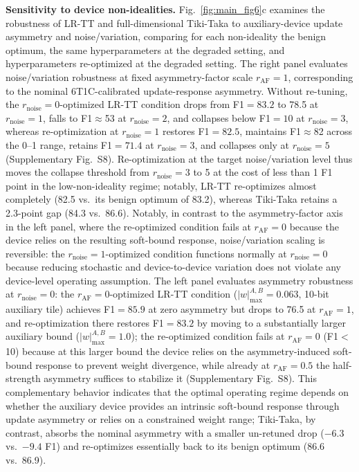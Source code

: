 \documentclass[fleqn,10pt]{wlscirep}
\begin{document}
\noindent
\textbf{Sensitivity to device non-idealities.}
Fig.~\ref{fig:main_fig6}c examines the robustness of LR-TT and full-dimensional Tiki-Taka to auxiliary-device update asymmetry and noise/variation, comparing for each non-ideality the benign optimum, the same hyperparameters at the degraded setting, and hyperparameters re-optimized at the degraded setting.
The right panel evaluates noise/variation robustness at fixed asymmetry-factor scale \(r_{\mathrm{AF}}=1\), corresponding to the nominal 6T1C-calibrated update-response asymmetry.
Without re-tuning, the \(r_{\mathrm{noise}}=0\)-optimized LR-TT condition drops from F1\(=83.2\) to 78.5 at \(r_{\mathrm{noise}}=1\), falls to F1\(\approx\)53 at \(r_{\mathrm{noise}}=2\), and collapses below F1\(=10\) at \(r_{\mathrm{noise}}=3\), whereas re-optimization at \(r_{\mathrm{noise}}=1\) restores F1\(=82.5\), maintains F1\(\approx\)82 across the 0--1 range, retains F1\(=71.4\) at \(r_{\mathrm{noise}}=3\), and collapses only at \(r_{\mathrm{noise}}=5\) (Supplementary Fig.~S8).
Re-optimization at the target noise/variation level thus moves the collapse threshold from \(r_{\mathrm{noise}}=3\) to 5 at the cost of less than 1 F1 point in the low-non-ideality regime; notably, LR-TT re-optimizes almost completely (82.5 vs.\ its benign optimum of 83.2), whereas Tiki-Taka retains a 2.3-point gap (84.3 vs.\ 86.6).
Notably, in contrast to the asymmetry-factor axis in the left panel, where the re-optimized condition fails at \(r_{\mathrm{AF}}=0\) because the device relies on the resulting soft-bound response, noise/variation scaling is reversible: the \(r_{\mathrm{noise}}=1\)-optimized condition functions normally at \(r_{\mathrm{noise}}=0\) because reducing stochastic and device-to-device variation does not violate any device-level operating assumption.
The left panel evaluates asymmetry robustness at \(r_{\mathrm{noise}}=0\): the \(r_{\mathrm{AF}}=0\)-optimized LR-TT condition (\(|w|_{\max}^{A,B}=0.063\), 10-bit auxiliary tile) achieves F1\(=85.9\) at zero asymmetry but drops to 76.5 at \(r_{\mathrm{AF}}=1\), and re-optimization there restores F1\(=83.2\) by moving to a substantially larger auxiliary bound (\(|w|_{\max}^{A,B}=1.0\)); the re-optimized condition fails at \(r_{\mathrm{AF}}=0\) (F1\(<\)10) because at this larger bound the device relies on the asymmetry-induced soft-bound response to prevent weight divergence, while already at \(r_{\mathrm{AF}}=0.5\) the half-strength asymmetry suffices to stabilize it (Supplementary Fig.~S8).
This complementary behavior indicates that the optimal operating regime depends on whether the auxiliary device provides an intrinsic soft-bound response through update asymmetry or relies on a constrained weight range; Tiki-Taka, by contrast, absorbs the nominal asymmetry with a smaller un-retuned drop (\(-6.3\) vs.\ \(-9.4\) F1) and re-optimizes essentially back to its benign optimum (86.6 vs.\ 86.9).
\end{document}

